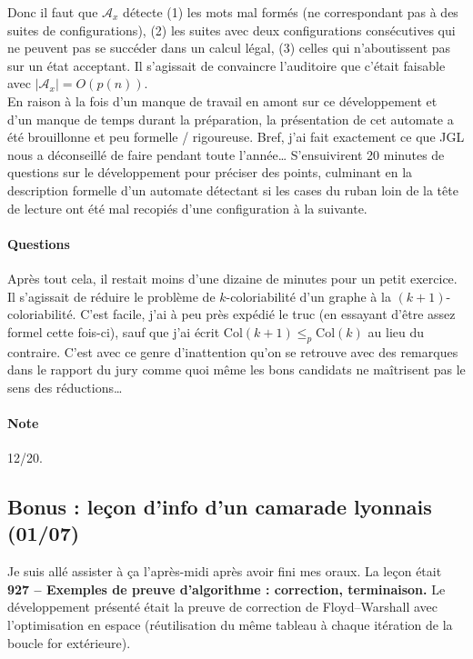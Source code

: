 \documentclass[a4paper, 11pt]{article}
\begin{document}
Donc il faut que $\mathcal{A}_x$ détecte (1) les mots mal formés (ne correspondant
pas à des suites de configurations), (2) les suites avec deux configurations
consécutives qui ne peuvent pas se succéder dans un calcul légal, (3) celles qui
n'aboutissent pas sur un état acceptant. Il s'agissait de convaincre l'auditoire
que c'était faisable avec $|\mathcal{A}_x| = O(p(n))$. \\

En raison à la fois d'un manque de travail en amont sur ce développement et d'un
manque de temps durant la préparation, la présentation de cet automate a été
brouillonne et peu formelle / rigoureuse. Bref, j'ai fait exactement ce que JGL
nous a déconseillé de faire pendant toute l'année… S'ensuivirent 20 minutes de
questions sur le développement pour préciser des points, culminant en la
description formelle d'un automate détectant si les cases du ruban loin de la
tête de lecture ont été mal recopiés d'une configuration à la suivante.

\paragraph{Questions}

Après tout cela, il restait moins d'une dizaine de minutes pour un petit
exercice. Il s'agissait de réduire le problème de $k$-coloriabilité d'un graphe
à la $(k+1)$-coloriabilité. C'est facile, j'ai à peu près expédié le truc (en
essayant d'être assez formel cette fois-ci), sauf que j'ai écrit
$\mathrm{Col}(k+1) \leq_p \mathrm{Col}(k)$ au lieu du contraire. C'est avec ce
genre d'inattention qu'on se retrouve avec des remarques dans le rapport du jury
comme quoi même les bons candidats ne maîtrisent pas le sens des réductions…

\paragraph{Note} 12/20.

\subsection*{Bonus : leçon d'info d'un camarade lyonnais (01/07)}

Je suis allé assister à ça l'après-midi après avoir fini mes oraux. La leçon
était \textbf{927 -- Exemples de preuve d'algorithme : correction, terminaison.}
Le développement présenté était la preuve de correction de Floyd--Warshall avec
l'optimisation en espace (réutilisation du même tableau à chaque itération de la
boucle for extérieure).
\end{document}
